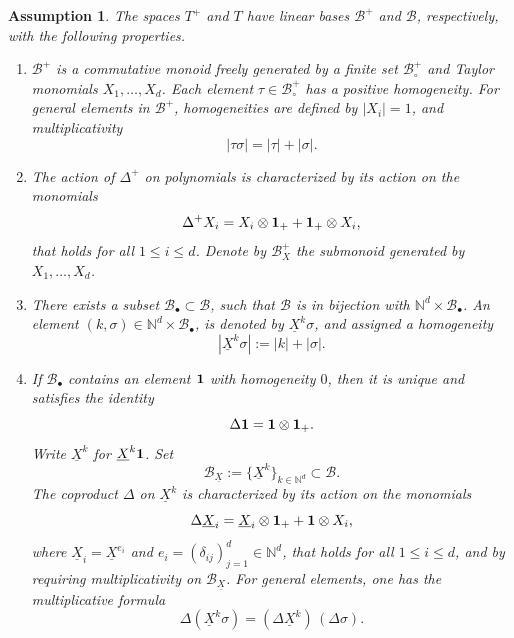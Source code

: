 \documentclass[11pt]{article}
\numberwithin{equation}{section}
\newcommand{\sbullet}{{\scriptscriptstyle\bullet}}
\theoremstyle{plain}
\newtheorem{assumption}{Assumption}
\theoremstyle{definition}
\newcommand{\bbN}{\mathbb{N}}
\newcommand{\mcB}{\mathcal{B}}
\begin{document}
\begin{assumption}\label{ass:A}
The spaces $T^+$ and $T$ have linear bases $\mcB^+$ and $\mcB$, respectively, with the following properties.
\begin{enumerate}
\item\label{ass:A1} $\mcB^+$ is a commutative monoid freely generated by a finite set $\mcB_\circ^+$ and Taylor monomials $X_1,\dots,X_d$.
Each element $\tau\in\mcB_\circ^+$ has a positive homogeneity. For general elements in $\mcB^+$, homogeneities are defined by $|X_i|=1$, and multiplicativity
\[
|\tau\sigma|=|\tau|+|\sigma|.
\]

\item\label{ass:A2} The action of $\Delta^+$ on polynomials is characterized by its action on the monomials
\begin{equation} \label{EqPreLeibniz}
\Delta^+X_i = X_i\otimes {\bf 1}_+ + {\bf 1}_+\otimes X_i,
\end{equation}
that holds for all $1\leq i\leq d$. Denote by $\mcB_X^+$ the submonoid generated by $X_1,\dots,X_d$.

\item\label{ass:A3} There exists a subset $\mcB_\sbullet\subset\mcB$, such that $\mcB$ is in bijection with $\bbN^d\times\mcB_\sbullet$. An element $(k,\sigma)\in\bbN^d\times\mcB_\sbullet$, is denoted by $\underline{X}^k\sigma$, and assigned a homogeneity
\[
|\underline{X}^k\sigma| := |k|+|\sigma|.
\]

\item\label{ass:A4} If $\mcB_\sbullet$ contains an element ${\bf 1}$ with homogeneity $0$, then it is unique and satisfies the identity
\[
\Delta{\bf 1} = {\bf 1}\otimes{\bf 1}_+.
\]
Write $\underline{X}^k$ for $\underline{X}^k{\bf1}$. Set
\[
\mcB_{\underline{X}} := \{\underline{X}^k\}_{k\in\bbN^d}\subset\mcB.
\]
The coproduct $\Delta$ on $\underline{X}^k$ is characterized by its action on the monomials
\[
\Delta \underline{X}_i = \underline{X}_i\otimes {\bf 1}_+ + {\bf 1}\otimes X_i,
\]
where $\underline{X}_i=\underline{X}^{e_i}$ and $e_i=(\delta_{ij})_{j=1}^d\in\bbN^d$, that holds for all $1\leq i\leq d$, and by requiring multiplicativity on $\mcB_{\underline{X}}$. For general elements, one has the multiplicative formula
\[
\Delta(\underline{X}^k\sigma) = (\Delta \underline{X}^k)\,(\Delta\sigma).
\]
\end{enumerate}
\end{assumption}
\end{document}
